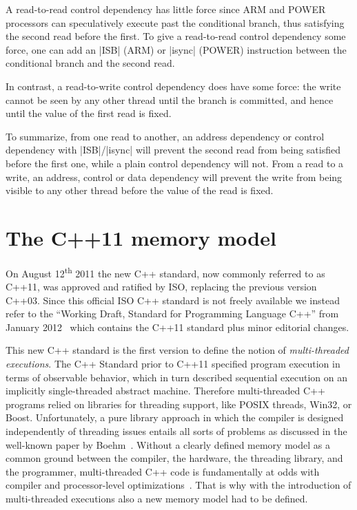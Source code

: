 \documentclass[a4paper,12pt,notitlepage,twoside,openright]{article}
\begin{document}
A read-to-read control dependency has little force since ARM and POWER
processors can speculatively execute past the conditional branch, thus
satisfying the second read before the first. To give a read-to-read
control dependency some force, one can add an |ISB| (ARM) or |isync|
(POWER) instruction between the conditional branch and the second read.

In contrast, a read-to-write control dependency does have some force:
the write cannot be seen by any other thread until the branch is committed,
and hence until the value of the first read is fixed.

To summarize, from one read to another, an address dependency or control
dependency with |ISB|/|isync| will prevent the second read from being
satisfied before the first one, while a plain control dependency will not.
From a read to a write, an address, control or data dependency will prevent
the write from being visible to any other thread before the value of the
read is fixed.

\section{The C++11 memory model}
\label{C++11 memory model}
On August 12\textsuperscript{th} 2011 the new C++ standard, now
commonly referred to as C++11, was approved and ratified by ISO,
replacing the previous version C++03. Since this official ISO C++
standard is not freely available we instead refer to the ``Working
Draft, Standard for Programming Language C++'' from January
2012~\cite{c++11_standard} which contains the C++11 standard plus
minor editorial changes.

This new C++ standard is the first version to define the notion of
\emph{multi-threaded executions}. The C++ Standard prior to C++11
specified program execution in terms of observable behavior, which in
turn described sequential execution on an implicitly single-threaded
abstract machine. Therefore multi-threaded C++ programs relied on
libraries for threading support, like POSIX threads, Win32, or
Boost. Unfortunately, a pure library approach in which the compiler is
designed independently of threading issues entails all sorts of
problems as discussed in the well-known paper by
Boehm~\cite{Boehm:2005:TCI:1064978.1065042}. Without a clearly defined
memory model as a common ground between the compiler, the hardware,
the threading library, and the programmer, multi-threaded C++ code is
fundamentally at odds with compiler and processor-level
optimizations~\cite{Meyers2004}. That is why with the introduction of
multi-threaded executions also a new memory model had to be defined.
\end{document}
